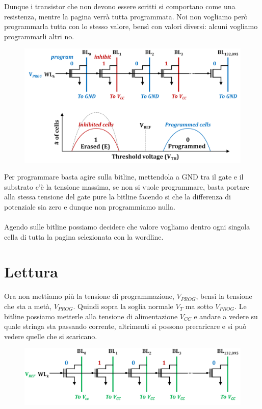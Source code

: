 \newpage
Dunque i transistor che non devono essere scritti si comportano come una resistenza, mentre  la pagina verrà tutta programmata. Noi non vogliamo però programmarla tutta con lo stesso valore, bensì con valori diversi: alcuni vogliamo programmarli altri no.


\begin{figure}[htbp]
    \centering
    \includegraphics[width=0.7\linewidth]{img/ajryt.png}
\end{figure}

Per programmare basta agire sulla bitline, mettendola a GND tra il gate e il substrato c'è la tensione massima, se non si vuole programmare, basta portare alla stessa tensione del gate pure la bitline facendo si che la differenza di potenziale sia zero e dunque non programmiamo nulla. 

\paragraph{}

Agendo sulle bitline possiamo decidere che valore vogliamo dentro ogni singola cella di tutta la pagina selezionata con la wordline.

\section{Lettura}

Ora non mettiamo più la tensione di programmazione, $V_{PROG}$, bensì la tensione che sta a metà, $V_{PROG}$. Quindi sopra la soglia normale $V_{T}$ ma sotto $V_{PROG}$. Le bitline possiamo metterle alla tensione di alimentazione $V_{CC}$ e andare a vedere su quale stringa sta passando corrente, altrimenti si possono precaricare e si può vedere quelle che si scaricano.

\begin{figure}[htbp]
    \centering
    \includegraphics[width=0.6\linewidth]{img/andfg.png}
\end{figure}

